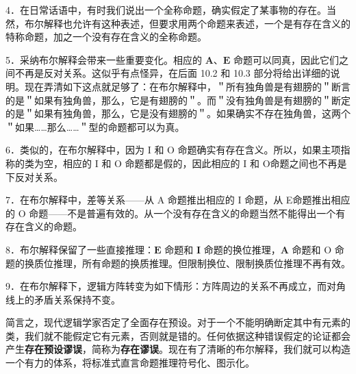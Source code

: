 \begin{logicbox}[title=章节导读]
4．在日常话语中，有时我们说出一个全称命题，确实假定了某事物的存在。当然，布尔解释也允许有这种表述，但要求用两个命题来表述，一个是有存在含义的特称命题，加之一个没有存在含义的全称命题。

5．采纳布尔解释会带来一些重要变化。相应的 $\mathbf{A、E}$ 命题可以同真，因此它们之间不再是反对关系。这似乎有点怪异，在后面 10.2 和 10.3 部分将给出详细的说明。现在弄清如下这点就足够了：在布尔解释中，＂所有独角兽是有翅膀的＂断言的是＂如果有独角兽，那么，它是有翅膀的＂。而＂没有独角兽是有翅膀的＂断定的是＂如果有独角兽，那么，它是没有翅膀的＂。如果确实不存在独角兽，这两个＂如果……那么……＂型的命题都可以为真。

6．类似的，在布尔解释中，因为 I 和 O 命题确实有存在含义。所以，如果主项指称的类为空，相应的 I 和 O 命题都是假的，因此相应的 I 和 O命题之间也不再是下反对关系。

7．在布尔解释中，差等关系——从 A 命题推出相应的 I 命题，从 E命题推出相应的 O 命题——不是普遍有效的。从一个没有存在含义的命题当然不能得出一个有存在含义的命题。

8．布尔解释保留了一些直接推理：$\mathbf{E}$ 命题和 $\mathbf{I}$ 命题的换位推理，$\mathbf{A}$ 命题和 O 命题的换质位推理，所有命题的换质推理。但限制换位、限制换质位推理不再有效。

9．在布尔解释下，逻辑方阵转变为如下情形：方阵周边的关系不再成立，而对角线上的矛盾关系保持不变。

简言之，现代逻辑学家否定了全面存在预设。对于一个不能明确断定其中有元素的类，我们就不能假定它有元素，否则就是错的。任何依据这种错误假定的论证都会产生\textbf{存在预设谬误}，简称为\textbf{存在谬误}。现在有了清晰的布尔解释，我们就可以构造一个有力的体系，将标准式直言命题推理符号化、图示化。




\end{logicbox}
